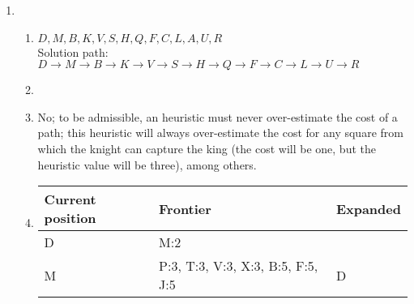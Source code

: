 \documentclass{article}
\begin{document}
\begin{enumerate}
    \item
    \begin{enumerate}
        \item $D, M, B, K, V, S, H, Q, F, C, L, A, U, R$\\
            Solution path: $D{\rightarrow}M{\rightarrow}B{\rightarrow}K{\rightarrow}V{\rightarrow}S{\rightarrow}H{\rightarrow}Q{\rightarrow}F{\rightarrow}C{\rightarrow}L{\rightarrow}U{\rightarrow}R$
        \item

        \item No; to be admissible, an heuristic must never over-estimate the cost of a path; this heuristic will always over-estimate the cost for any square from which the knight can capture the king (the cost will be one, but the heuristic value will be three), among others.

        \item 
            \begin{tabular}{|l|l|l|}
                \hline
                    Current position & Frontier & Expanded \\\hline
                    D & M:2 & \\\hline
                    M & P:3, T:3, V:3, X:3, B:5, F:5, J:5 & D \\\hline
                \hline
            \end{tabular}
    \end{enumerate}
\end{enumerate}
\end{document}
